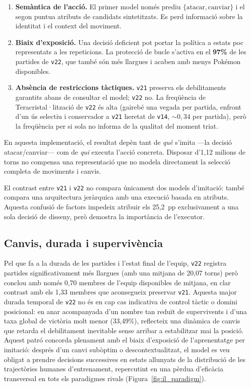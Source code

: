 \begin{enumerate}
    \item \textbf{Semàntica de l'acció.} El primer model només prediu $\{\mathrm{atacar},\mathrm{canviar}\}$ i el segon puntua atributs de candidats sintetitzats. Es perd informació sobre la identitat i el context del moviment.
    \item \textbf{Biaix d'exposició.} Una decisió deficient pot portar la política a estats poc representats a les repeticions. La protecció de bucle s'activa en el \textbf{97\%} de les partides de \texttt{v22}, que també són més llargues i acaben amb menys Pokémon disponibles.
    \item \textbf{Absència de restriccions tàctiques.} \texttt{v21} preserva els debilitaments garantits abans de consultar el model; \texttt{v22} no. La freqüència de Teracristal·lització de \texttt{v22} és alta (gairebé una vegada per partida, enfront d'un ús selectiu i conservador a \texttt{v21} heretat de \texttt{v14}, $\sim 0{,}34$ per partida), però la freqüència per si sola no informa de la qualitat del moment triat.
\end{enumerate}

En aquesta implementació, el resultat depèn tant de \emph{què} s'imita ---la decisió atacar/canviar--- com de \emph{qui} executa l'acció concreta. Disposar d'1,12 milions de torns no compensa una representació que no modela directament la selecció completa de moviments i canvis.

El contrast entre \texttt{v21} i \texttt{v22} no compara únicament dos models d'imitació: també compara una arquitectura jeràrquica amb una execució basada en atributs. Aquesta confusió de factors impedeix atribuir els 25,2~pp exclusivament a una sola decisió de disseny, però demostra la importància de l'executor.

\subsection{Canvis, durada i supervivència}

Pel que fa a la durada de les partides i l'estat final de l'equip, \texttt{v22} registra partides significativament més llargues (amb una mitjana de 20,07 torns) però conclou amb només 0,70 membres de l'equip disponibles de mitjana, en clar contrast amb els 1,33 membres que aconsegueix preservar \texttt{v21}. Aquesta major durada temporal de \texttt{v22} no és en cap cas indicativa de control tàctic o domini posicional: en anar acompanyada d'un nombre tan reduït de supervivents i d'una taxa global de victòria molt menor (33,49\%), reflecteix una dinàmica de canvis que retarda el debilitament inevitable sense arribar a estabilitzar mai la posició. Aquest patró concorda plenament amb el biaix d'exposició de l'aprenentatge per imitació: després d'un canvi subòptim o descontextualitzat, el model es veu obligat a prendre decisions successives en estats allunyats de la distribució de les trajectòries humanes d'entrenament, repercutint en una pèrdua d'eficàcia transversal en tots els paradigmes rivals (Figura~\ref{fig:il_paradigm}).

